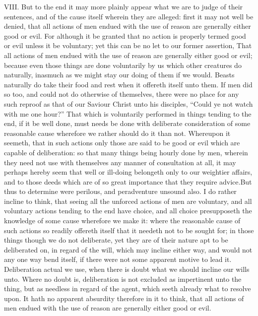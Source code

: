 VIII. But to the end it may more plainly appear what we are to judge of their sentences, and of the cause itself wherein they are alleged: first it may not well be denied, that all actions of men endued with the use of reason are generally either good or evil. For although it be granted that no action is properly termed good or evil unless it be voluntary; yet this can be no let to our former assertion, That all actions of men endued with the use of reason are generally either good or evil; because even those things are done voluntarily by us which other creatures do naturally, inasmuch as we might stay our doing of them if we would. Beasts naturally do take their food and rest when it offereth itself unto them. If men did so too, and could not do otherwise of themselves, there were no place for any such reproof as that of our Saviour Christ unto his disciples, “Could ye not watch with me one hour?” That which is voluntarily performed in things tending to the end, if it be well done, must needs be done with deliberate consideration of some reasonable cause wherefore we rather should do it than not. Whereupon it seemeth, that in such actions only those are said to be good or evil which are capable of deliberation: so that many things being hourly done by men, wherein they need not use with themselves any manner of consultation at all, it may perhaps hereby seem that well or ill-doing belongeth only to our  weightier affairs, and to those deeds which are of so great importance that they require advice.But thus to determine were perilous, and peradventure unsound also. I do rather incline to think, that seeing all the unforced actions of men are voluntary, and all voluntary actions tending to the end have choice, and all choice presupposeth the knowledge of some cause wherefore we make it: where the reasonable cause of such actions so readily offereth itself that it needeth not to be sought for; in those things though we do not deliberate, yet they are of their nature apt to be deliberated on, in regard of the will, which may incline either way, and would not any one way bend itself, if there were not some apparent motive to lead it. Deliberation actual we use, when there is doubt what we should incline our wills unto. Where no doubt is, deliberation is not excluded as impertinent unto the thing, but as needless in regard of the agent, which seeth already what to resolve upon. It hath no apparent absurdity therefore in it to think, that all actions of men endued with the use of reason are generally either good or evil.

